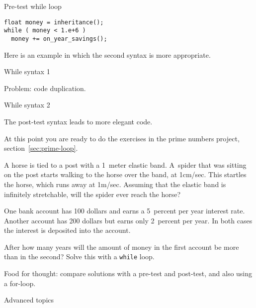 \begin{block}{Pre-test while loop}
  \label{sl:while-pre}
\begin{lstlisting}
float money = inheritance();
while ( money < 1.e+6 )
  money += on_year_savings();
\end{lstlisting}
\end{block}

Here
is an example in which the second syntax is more appropriate.

\begin{block}{While syntax 1}
  \label{sl:while2}

  Problem: code duplication.
\end{block}

\begin{block}{While syntax 2}
  \label{sl:while3}

  The post-test syntax leads to more elegant code.
\end{block}

\begin{exercise}
  At this point you are ready to do the exercises
  in the prime numbers project, section~\ref{sec:prime-loop}.
\end{exercise}

\begin{exercise}
  \label{ex:horsespider}
  A horse is tied to a post with a 1~meter elastic band. A~spider that
  was sitting on the post starts walking to the horse over the band,
  at 1cm/sec. This startles the horse, which runs away at
  1m/sec. Assuming that the elastic band is infinitely stretchable,
  will the spider ever reach the horse?
\end{exercise}
\begin{exercise}
  \label{ex:interest}
  One bank account has 100 dollars and earns a 5~percent per year interest
  rate. Another account has 200 dollars but earns only 2~percent per
  year. In both cases the interest is deposited into the account.
  
  After how many years will the amount of money in the first account
  be more than in the second? Solve this with a \lstinline{while} loop.

  Food for thought: compare solutions with a pre-test and post-test,
  and also using a for-loop.
\end{exercise}

 {Advanced topics}

